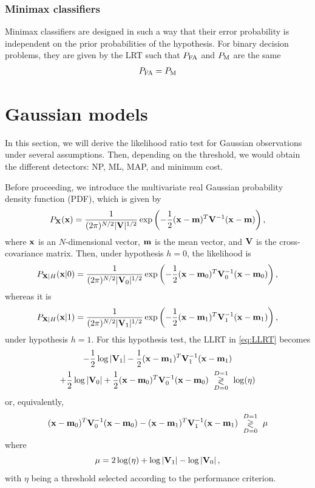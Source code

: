 \subsubsection{Minimax classifiers}

Minimax classifiers are designed in such a way that their error probability is independent on the prior probabilities of the hypothesis. For binary decision problems, they are given by the LRT such that $P_{\text{FA}}$ and $P_{\text{M}}$ are the same
\begin{align}
P_{\text{FA}} = P_{\text{M}}
\end{align}


\section{Gaussian models}

In this section, we will derive the likelihood ratio test for Gaussian observations under several assumptions. Then, depending on the threshold, we would obtain the different detectors: NP, ML, MAP, and minimum cost.

Before proceeding, we introduce the multivariate real Gaussian probability density function (PDF), which is given by
\begin{equation*}
P_{{\bf X}}({\bf x}) = \frac{1}{(2\pi)^{N/2} |{\bf V}|^{1/2}}
\exp\left(-\frac{1}{2}({\bf x}-{\bf m})^T {\bf V}^{-1}({\bf x}-{\bf m})\right),
\label{pXGauss}
\end{equation*}
where ${\bf x}$ is an $N$-dimensional vector, ${\bf m}$ is the mean vector, and ${\bf V}$ is the cross-covariance matrix. Then, under hypothesis $h = 0$, the likelihood is
\begin{equation*}
P_{{\bf X}|H}({\bf x}|0) = \frac{1}{(2\pi)^{N/2} |{\bf V}_0|^{1/2}}
\exp\left(-\frac{1}{2}({\bf x}-{\bf m}_0)^T {\bf V}_0^{-1}({\bf x}-{\bf m}_0)\right),
\end{equation*}
whereas it is
\begin{equation*}
P_{{\bf X}|H}({\bf x}|1) = \frac{1}{(2\pi)^{N/2} |{\bf V}_1|^{1/2}}
\exp\left(-\frac{1}{2}({\bf x}-{\bf m}_1)^T {\bf V}_1^{-1}({\bf x}-{\bf m}_1)\right),
\end{equation*}
under hypothesis $h = 1$. For this hypothesis test, the LLRT in \eqref{eq:LLRT} becomes
\begin{multline*}
- \frac{1}{2}\log\left|{\bf V}_1 \right| 
- \frac{1}{2}({\bf x}-{\bf m}_1)^T {\bf V}_1^{-1}({\bf x}-{\bf m}_1) \\
+ \frac{1}{2}\log\left|{\bf V}_0 \right| 
+ \frac{1}{2}({\bf x}-{\bf m}_0)^T {\bf V}_0^{-1}({\bf x}-{\bf m}_0) 
\,\, \underset{D=0}{\overset{D=1}{\gtrless}}\,\, \log(\eta) 
\end{multline*}
or, equivalently,
\begin{align}
({\bf x}-{\bf m}_0)^T {\bf V}_0^{-1}({\bf x}-{\bf m}_0) 
- ({\bf x}-{\bf m}_1)^T {\bf V}_1^{-1}({\bf x}-{\bf m}_1)
\,\, \underset{D=0}{\overset{D=1}{\gtrless}}\,\, \mu
\label{eq:logLRTGauss}
\end{align}
where
\begin{equation*}
\mu = 2 \log(\eta) + \log\left|{\bf V}_1 \right| - \log\left|{\bf V}_0 \right|,
\end{equation*}
with $\eta$ being a threshold selected according to the performance criterion.

